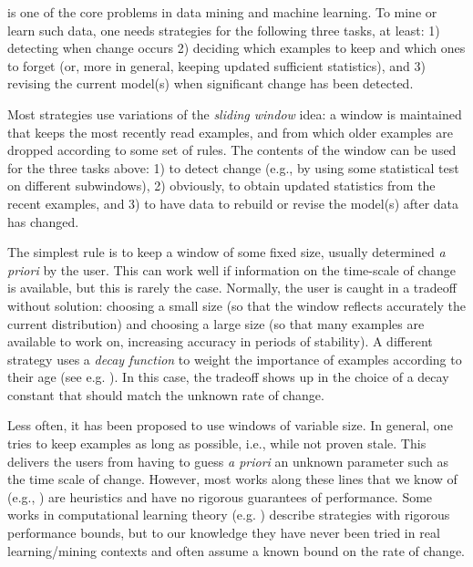 

\BEGINOMIT
is one of the core problems in data mining and machine learning.
To mine or learn such data, one needs strategies for
the following three tasks, at least: 1) detecting when
change occurs 2) deciding which examples to keep and which ones
to forget (or, more in general, keeping updated sufficient statistics),
and 3) revising the current model(s) when significant  
change has been detected.

Most strategies use variations of the {\em sliding window} idea:
a window is maintained that keeps the most recently read examples,
and from which older examples are dropped according to some
set of rules. The contents of the window can be used for the
three tasks above: 1) to detect change (e.g., by using some statistical
test on different subwindows), 2) obviously, to
obtain updated statistics from the recent examples,
and 3) to have data to rebuild or revise the model(s) after data has 
changed.

The simplest rule is to keep a window
of some fixed size, usually determined {\em a priori} by the user.
This can work well if information on the time-scale
of change is available, but this is rarely the case.
Normally, the user is caught in a tradeoff without solution:
choosing a small size (so that the window reflects accurately the current distribution)
and choosing a large size (so that many examples are available to work on, 
increasing accuracy in periods of stability).
A different strategy uses a {\em decay function}
to weight the importance of examples according to their
age (see e.g. \cite{CS03}). %
In this case, the tradeoff shows up in the 
choice of a decay constant that should match the unknown rate of change.

Less often, it has been proposed to use windows of variable size.
In general, one tries to keep examples as long as possible, i.e., 
while not proven stale. This delivers
the users from having to guess {\em a priori} an unknown parameter such
as the time scale of change. However, most works along these lines 
that we know of (e.g., \cite{Gama,Klinkenberg,Last,WidmerKubat})
are heuristics and have no rigorous guarantees of performance. 
Some works in computational learning theory 
(e.g. \cite{bartlett00,helmbold94tracking,herbster95tracking}) 
describe strategies with rigorous performance
bounds, but to our knowledge they have never been tried
in real learning/mining contexts and often assume a known bound 
on the rate of change. 

